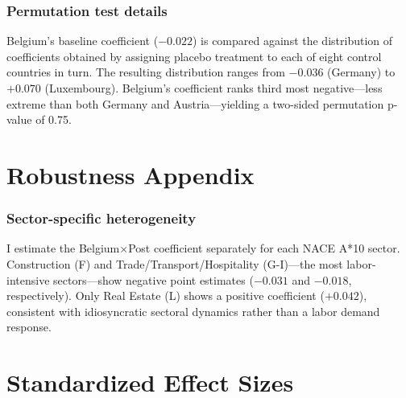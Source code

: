 \documentclass[12pt]{article}
\begin{document}
\subsubsection*{Permutation test details} Belgium's baseline coefficient ($-0.022$) is compared against the distribution of coefficients obtained by assigning placebo treatment to each of eight control countries in turn. The resulting distribution ranges from $-0.036$ (Germany) to $+0.070$ (Luxembourg). Belgium's coefficient ranks third most negative---less extreme than both Germany and Austria---yielding a two-sided permutation p-value of 0.75.

\section{Robustness Appendix}

\subsubsection*{Sector-specific heterogeneity} I estimate the Belgium$\times$Post coefficient separately for each NACE A*10 sector. Construction (F) and Trade/Transport/Hospitality (G-I)---the most labor-intensive sectors---show negative point estimates ($-0.031$ and $-0.018$, respectively). Only Real Estate (L) shows a positive coefficient ($+0.042$), consistent with idiosyncratic sectoral dynamics rather than a labor demand response.

\section{Standardized Effect Sizes}
\label{sec:sde}


\end{document}
